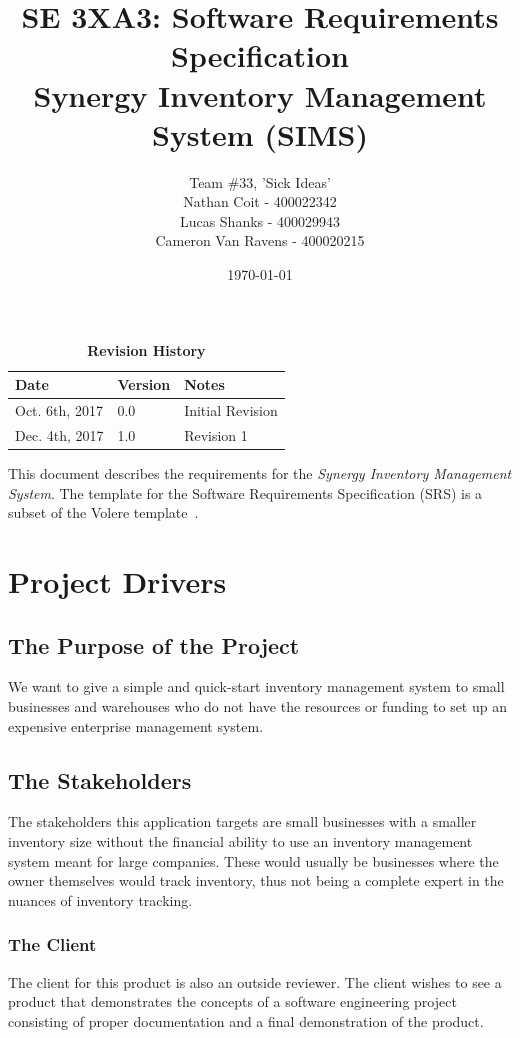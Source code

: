 \documentclass[12pt, titlepage]{article}
\title{SE 3XA3: Software Requirements Specification\\Synergy Inventory Management System (SIMS)}
\author{Team \#33, 'Sick Ideas'
		\\ Nathan Coit - 400022342
		\\ Lucas Shanks - 400029943
		\\ Cameron Van Ravens - 400020215
}
\date{\today}
\begin{document}
\maketitle

\tableofcontents
\listoftables
\listoffigures

\begin{table}[bp]
\caption{\bf Revision History}
\begin{tabularx}{\textwidth}{p{3cm}p{2cm}X}
\toprule {\bf Date} & {\bf Version} & {\bf Notes}\\
\midrule
Oct. 6th, 2017 & 0.0 & Initial Revision\\
Dec. 4th, 2017 & 1.0 & Revision 1\\
\bottomrule
\end{tabularx}
\end{table}

\newpage

\noindent
This document describes the requirements for the \textit{Synergy Inventory Management System}.
\noindent
The template for the Software Requirements Specification (SRS) is a subset of the Volere template~\citep{RobertsonAndRobertson2012}.

\section{Project Drivers}

\subsection{The Purpose of the Project}
\noindent
We want to give a simple and quick-start inventory management system to small businesses and warehouses who do not have the resources or funding to set up an expensive enterprise management system.

\subsection{The Stakeholders} %
\noindent
The stakeholders this application targets are small businesses with a smaller inventory size without the financial ability to use an inventory management system meant for large companies. These would usually be businesses where the owner themselves would track inventory, thus not being a complete expert in the nuances of inventory tracking.

\subsubsection{The Client}
The client for this product is also an outside reviewer. The client wishes to see a product that demonstrates the concepts of a software engineering project consisting of proper documentation and a final demonstration of the product.
\end{document}
